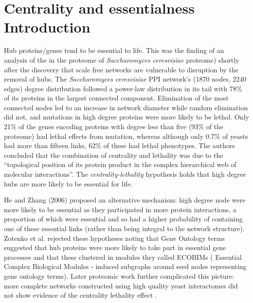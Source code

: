 \section{Centrality and essentialness Introduction}
\label{sec:Degree and essentialness}
Hub proteins/genes tend to be essential to life. This was the finding of an analysis of the in the proteome of \textit{Saccharomyces ceresvisiae} proteome) \cite{jeong2001lethality}  shortly after the discovery that scale free networks are vulnerable to disruption by the removal of hubs\cite{albert2000error}.
  The  \textit{Saccharomyces ceresvisiae} PPI network's (1870 nodes, 2240 edges) degree distribution followed a power-law distribution in its tail with 78\% of its proteins in the largest connected component\cite{jeong2001lethality}.  Elimination of the most connected nodes led to an increase in network diameter while random elimination did not, and mutations in high degree proteins were more likely to be lethal. Only 21\% of the genes encoding proteins with degree less than five (93\% of the proteome) had lethal effects from mutation, whereas although only 0.7\% of yeasts had more than fifteen links,  62\% of these had lethal phenotypes. The authors \cite{jeong2001lethality} concluded that the combination of centrality and lethality was due to the ``topological position of its protein product in the complex hierarchical web of molecular interactions''. The \textit{centrality-lethality} hypothesis holds that high degree hubs are more likely to be essential for life\cite{zotenko2008hubs}. 

He and Zhang (2006)\cite{he2006hubs} proposed an alternative mechanism: high degree node were more likely to be essential as they participated in more protein interactions, a proportion of which were essential and so had a higher probability of containing one of these essential links (rather than being integral to the network structure). Zotenko et al. \cite{zotenko2008hubs} rejected these hypotheses noting that Gene Ontology terms suggested that hub proteins were more likely to take part in essential gene processes and that these clustered in modules they called ECOBIMs ( Essential Complex Biological Modules - induced subgraphs around seed nodes representing gene ontology terms).  
Later proteomic work further complicated this picture: more complete networks constructed using high quality yeast interactomes did not show evidence of the centrality lethality effect\cite{milenkovic2011dominating} \cite{yu2008high} \cite{ratmann2009evidence}. 


